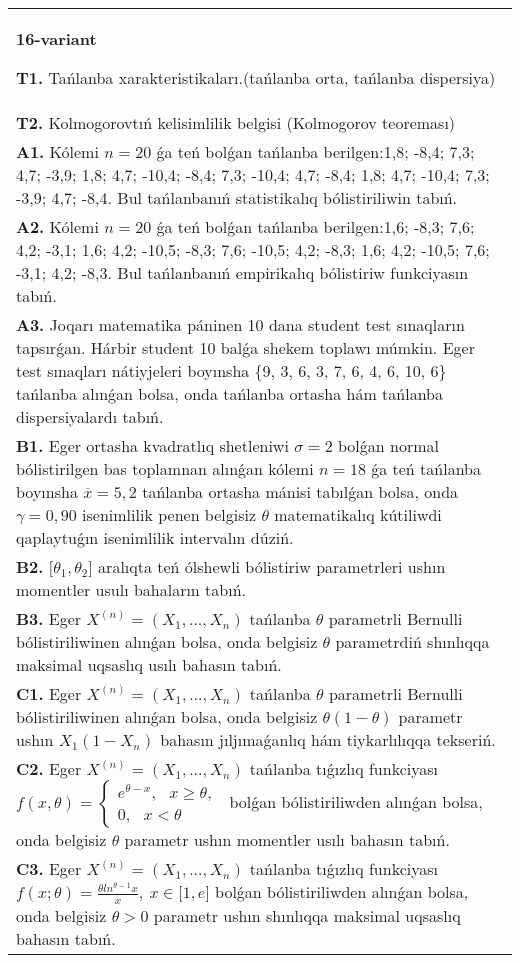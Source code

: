 \documentclass{article}
\begin{document}
\begin{tabular}{m{17cm}}
\textbf{16-variant}
\newline

\textbf{T1.} 
Tańlanba xarakteristikaları.(tańlanba orta, tańlanba dispersiya)
 \\
\textbf{T2.} 
Kolmogorovtıń kelisimlilik belgisi (Kolmogorov teoreması)
 \\
\textbf{A1.} 
Kólemi \(n = 20\) ǵa teń bolǵan tańlanba berilgen:1,8; -8,4; 7,3; 4,7; -3,9; 1,8; 4,7; -10,4; -8,4; 7,3; -10,4; 4,7; -8,4; 1,8; 4,7; -10,4; 7,3; -3,9; 4,7; -8,4. Bul tańlanbanıń statistikalıq bólistiriliwin tabıń.
 \\
\textbf{A2.} 
Kólemi \(n = 20\) ǵa teń bolǵan tańlanba berilgen:1,6; -8,3; 7,6; 4,2; -3,1; 1,6; 4,2; -10,5; -8,3; 7,6; -10,5; 4,2; -8,3; 1,6; 4,2; -10,5; 7,6; -3,1; 4,2; -8,3. Bul tańlanbanıń empirikalıq bólistiriw funkciyasın tabıń.
 \\
\textbf{A3.} 
Joqarı matematika páninen 10 dana student test sınaqların tapsırǵan. Hárbir student 10 balǵa shekem toplawı múmkin. Eger test sınaqları nátiyjeleri boyınsha \{9, 3, 6, 3, 7, 6, 4, 6, 10, 6\} tańlanba alınǵan bolsa, onda tańlanba ortasha hám tańlanba dispersiyalardı tabıń.
 \\
\textbf{B1.} 
Eger ortasha kvadratlıq shetleniwi \(\sigma = 2\) bolǵan normal bólistirilgen bas toplamnan alınǵan kólemi \(n = 18\) ǵa teń tańlanba boyınsha \(\overline{x} = 5,2\) tańlanba ortasha mánisi tabılǵan bolsa, onda \(\gamma = 0,90\) isenimlilik penen belgisiz \(\theta\) matematikalıq kútiliwdi qaplaytuǵın isenimlilik intervalın dúziń.
 \\
\textbf{B2.} 
\(\lbrack\theta_{1},\theta_{2}\rbrack\) aralıqta teń ólshewli bólistiriw parametrleri ushın momentler usulı bahaların tabıń.
 \\
\textbf{B3.} 
Eger \(X^{(n)} = \left( X_{1},...,X_{n} \right)\) tańlanba \(\theta\) parametrli Bernulli bólistiriliwinen alınǵan bolsa, onda belgisiz \(\theta\) parametrdiń shınlıqqa maksimal uqsaslıq usılı bahasın tabıń.
 \\
\textbf{C1.} 
Eger \(X^{(n)} = \left( X_{1},...,X_{n} \right)\) tańlanba \(\theta\) parametrli Bernulli bólistiriliwinen alınǵan bolsa, onda belgisiz \(\theta(1 - \theta)\) parametr ushın \(X_{1}\left( 1 - X_{n} \right)\) bahasın jıljımaǵanlıq hám tiykarlılıqqa tekseriń.
 \\
\textbf{C2.} 
Eger \(X^{(n)} = \left( X_{1},...,X_{n} \right)\) tańlanba tıǵızlıq funkciyası
$
{f(x,\theta) = \left\{ \begin{array}{r}
e^{\theta - x},\ \ \ x \geq \theta, \\
0,\ \ \ x < \theta
\end{array} \right.\ }$
bolǵan bólistiriliwden alınǵan bolsa, onda belgisiz \(\theta\) parametr ushın momentler usılı bahasın tabıń.
 \\
\textbf{C3.} 
Eger \(X^{(n)} = \left( X_{1},...,X_{n} \right)\) tańlanba tıǵızlıq funkciyası
$f(x;\theta) = \frac{\theta ln^{\theta - 1}x}{x},\ x \in \lbrack 1,e\rbrack$
bolǵan bólistiriliwden alınǵan bolsa, onda belgisiz \(\theta > 0\) parametr ushın shınlıqqa maksimal uqsaslıq bahasın tabıń.
 \\

\end{tabular}
\end{document}
